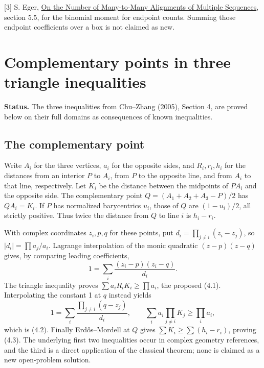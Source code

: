 \documentclass[11pt,a4paper]{article}
\numberwithin{equation}{section}
\theoremstyle{definition}
\theoremstyle{remark}
\begin{document}
[3] S. Eger, \href{https://arxiv.org/abs/1511.00622}{On the Number of Many-to-Many Alignments of Multiple Sequences}, section 5.5, for the binomial moment for endpoint counts. Summing those endpoint coefficients over a box is not claimed as new.

\par\endgroup

\begingroup

\section{\texorpdfstring{Complementary points in three triangle inequalities}{Complementary points in three triangle inequalities}}\label{section:r39showa}
\par\medskip


\noindent\textbf{Status.} The three inequalities from Chu--Zhang (2005), Section 4, are proved below on their full domains as consequences of known inequalities.

\subsection{The complementary point}
Write $A_i$ for the three vertices, $a_i$ for the opposite sides, and $R_i,r_i,h_i$ for the distances from an interior $P$ to $A_i$, from $P$ to the opposite line, and from $A_i$ to that line, respectively. Let $K_i$ be the distance between the midpoints of $PA_i$ and the opposite side. The complementary point $Q=(A_1+A_2+A_3-P)/2$ has $QA_i=K_i$. If $P$ has normalized barycentrics $u_i$, those of $Q$ are $(1-u_i)/2$, all strictly positive. Thus twice the distance from $Q$ to line $i$ is $h_i-r_i$.

With complex coordinates $z_i,p,q$ for these points, put $d_i=\prod_{j\ne i}(z_i-z_j)$, so $|d_i|=\prod a_j/a_i$. Lagrange interpolation of the monic quadratic $(z-p)(z-q)$ gives, by comparing leading coefficients,
\[
 1=\sum_i\frac{(z_i-p)(z_i-q)}{d_i}.
\]
The triangle inequality proves $\sum a_iR_iK_i\ge\prod a_i$, the proposed (4.1). Interpolating the constant 1 at $q$ instead yields
\[
 1=\sum_i\frac{\prod_{j\ne i}(q-z_j)}{d_i},
 \qquad \sum_i a_i\prod_{j\ne i}K_j\ge\prod_i a_i,
\]
which is (4.2). Finally Erd\H{o}s--Mordell at $Q$ gives $\sum K_i\ge\sum(h_i-r_i)$, proving (4.3). The underlying first two inequalities occur in complex geometry references, and the third is a direct application of the classical theorem; none is claimed as a new open-problem solution.
\end{document}
